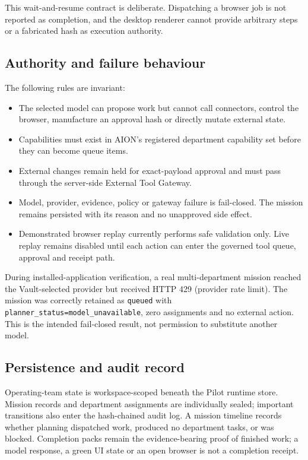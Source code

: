 This wait-and-resume contract is deliberate. Dispatching a browser job is not
reported as completion, and the desktop renderer cannot provide arbitrary
steps or a fabricated hash as execution authority.

\subsection*{Authority and failure behaviour}

The following rules are invariant:

\begin{itemize}[leftmargin=*]
\item The selected model can propose work but cannot call connectors, control
the browser, manufacture an approval hash or directly mutate external state.
\item Capabilities must exist in AION's registered department capability set
before they can become queue items.
\item External changes remain held for exact-payload approval and must pass
through the server-side External Tool Gateway.
\item Model, provider, evidence, policy or gateway failure is fail-closed. The
mission remains persisted with its reason and no unapproved side effect.
\item Demonstrated browser replay currently performs safe validation only.
Live replay remains disabled until each action can enter the governed tool
queue, approval and receipt path.
\end{itemize}

During installed-application verification, a real multi-department mission
reached the Vault-selected provider but received HTTP 429 (provider rate
limit). The mission was correctly retained as \texttt{queued} with
\texttt{planner\_status=model\_unavailable}, zero assignments and no external
action. This is the intended fail-closed result, not permission to substitute
another model.

\subsection*{Persistence and audit record}

Operating-team state is workspace-scoped beneath the Pilot runtime store.
Mission records and department assignments are individually sealed; important
transitions also enter the hash-chained audit log. A mission timeline records
whether planning dispatched work, produced no department tasks, or was
blocked. Completion packs remain the evidence-bearing proof of finished work;
a model response, a green UI state or an open browser is not a completion
receipt.

